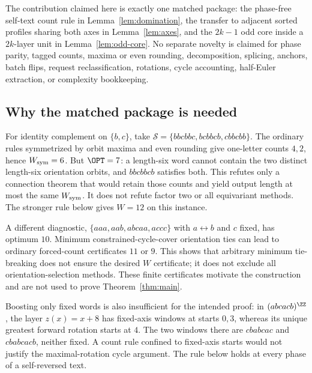 The contribution claimed here is exactly one matched package:
the phase-free self-text count rule in Lemma~\ref{lem:domination}, the transfer
to adjacent sorted profiles sharing both axes in Lemma~\ref{lem:axes}, and
the $2k-1$ odd core inside a $2k$-layer unit in Lemma~\ref{lem:odd-core}.
No separate novelty is claimed for phase parity, tagged counts,
maxima or even rounding, decomposition, splicing, anchors, batch flips,
request reclassification, rotations, cycle accounting, half-Euler
extraction, or complexity bookkeeping.

\subsection{Why the matched package is needed}\label{sec:motivation}
For identity complement on $\{b,c\}$, take
$\mathcal S=\{bbcbbc,bcbbcb,cbbcbb\}$. The ordinary rules symmetrized
by orbit maxima and even rounding give one-letter counts $4,2$, hence
$W_{\rm sym}=6$. But $\OPT=7$: a length-six word cannot contain the two
distinct length-six orientation orbits, and $bbcbbcb$ satisfies both.
This refutes only a connection theorem that would retain those counts
and yield output length at most the same $W_{\rm sym}$. It does not
refute factor two or all equivariant methods. The stronger rule below
gives $W=12$ on this instance.

A different diagnostic, $\{aaa,aab,abcaa,accc\}$ with $a\leftrightarrow b$
and $c$ fixed, has optimum $10$. Minimum constrained-cycle-cover
orientation ties can lead to ordinary forced-count certificates $11$
or $9$. This shows that arbitrary minimum tie-breaking does not ensure
the desired $W$ certificate; it does not exclude all orientation-selection
methods. These finite certificates motivate the construction and are not
used to prove Theorem~\ref{thm:main}.

Boosting only fixed words is also insufficient for the intended proof:
in $(abcacb)^{\ZZ}$, the layer $z(x)=x+8$ has fixed-axis windows at starts
$0,3$, whereas its unique greatest forward rotation starts at $4$.
The two windows there are $cbabcac$ and $cbabcacb$, neither fixed.
A count rule confined to fixed-axis starts would not justify the
maximal-rotation cycle argument. The rule below holds at every phase
of a self-reversed text.
